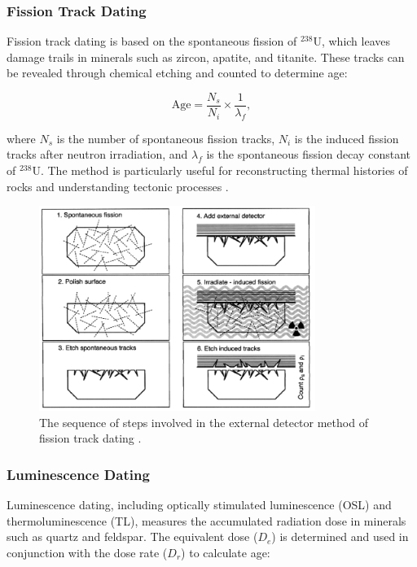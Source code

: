 \documentclass{article}
\begin{document}
\subsubsection*{Fission Track Dating}  
Fission track dating is based on the spontaneous fission of $^{238}$U, which leaves damage trails in minerals such as zircon, apatite, and titanite. These tracks can be revealed through chemical etching and counted to determine age:

\begin{equation}
\text{Age} = \frac{N_s}{N_i} \times \frac{1}{\lambda_f},
\end{equation}

where $N_s$ is the number of spontaneous fission tracks, $N_i$ is the induced fission tracks after neutron irradiation, and $\lambda_f$ is the spontaneous fission decay constant of $^{238}$U. The method is particularly useful for reconstructing thermal histories of rocks and understanding tectonic processes \cite{Gleadow1986Fission}.

\begin{figure}[htbp]
    \centering
    \includegraphics[width=0.8\textwidth]{fission_track.png}
    \caption{The sequence of steps involved in the external detector method of fission track dating \cite{FissionTrackDiagram}.}
    \label{fig:fission_track}
\end{figure}

\subsubsection*{Luminescence Dating}  
Luminescence dating, including optically stimulated luminescence (OSL) and thermoluminescence (TL), measures the accumulated radiation dose in minerals such as quartz and feldspar. The equivalent dose ($D_e$) is determined and used in conjunction with the dose rate ($D_r$) to calculate age:
\end{document}
